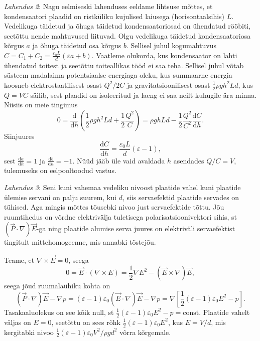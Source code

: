 \textit{Lahendus 2}: Nagu eelmiseski lahenduses eeldame lihtsuse mõttes, et kondensaatori plaadid on ristküliku kujulised laiusega (horisontaalsihis) $L$. Vedelikuga täidetud ja õhuga täidetud kondensaatoriosad on ühendatud rööbiti, seetõttu nende mahtuvused liituvad. Olgu vedelikuga täidetud kondensaatoriosa kõrgus $a$ ja õhuga täidetud osa kõrgus $b$. Sellisel juhul  kogumahtuvus $C=C_1+C_2= \frac{\varepsilon_0 L}{d}(\varepsilon a+b)$. Vaatleme olukorda, kus kondensaator on lahti ühendatud toitest ja seetõttu toiteallikas tööd ei saa teha. Sellisel juhul võtab süsteem madalaima potentsiaalse energiaga oleku, kus summaarne energia koosneb elektrostaatilisest osast $Q^2/2C$ ja gravitatsioonilisest osast $\frac 12\rho g h^2Ld$, kus $Q=VC$ säilib, sest plaadid on isoleeritud ja laeng ei saa neilt kuhugile ära minna. Niisiis on meie tingimus
$$0=\frac {\mathrm d}{\mathrm d h}\left( \frac 12\rho g h^2Ld+\frac 12\frac{Q^2}C\right)= \rho g hLd-\frac 12\frac{Q^2}{C^{2}} \frac{\mathrm dC}{\mathrm dh}.$$
Siinjuures
$$ \frac{\mathrm dC}{\mathrm dh}=\frac{\varepsilon_0 L}{d}(\varepsilon -1),$$
sest $\frac{\mathrm da}{\mathrm dh}=1$ ja $\frac{\mathrm db}{\mathrm dh}=-1$. Nüüd jääb üle vaid avaldada $h$ asendades $Q/C=V$, tulemuseks on eelpooltoodud vastus.

\textit{Lahendus 3}:
Seni kuni vahemaa vedeliku nivoost plaatide vahel kuni plaatide ülemise servani on palju suurem, kui $d$, siis servaefektid plaatide servades on tühised. Aga mingis mõttes tõusebki nivoo just servaefektide tõttu. Jõu ruumtihedus on võrdne elektrivälja tuletisega polarisatsioonivektori sihis, st $(\vec P\cdot\nabla)\vec E$-ga ning plaatide alumise serva juures on elektriväli servaefektist tingitult mittehomogeenne, mis annabki tõstejõu.

Teame, et $\nabla \times\vec E=0$, seega
\[
  0=\vec E\cdot(\nabla \times E)=\frac 12 \nabla E^2-(\vec E\times\nabla)\vec E,
\]
seega jõud ruumalaühiku kohta on
\[(\vec P \cdot \nabla)\vec E-\nabla p=(\varepsilon-1)\varepsilon_0(\vec E \cdot \nabla)\vec E-\nabla p=\nabla \left[\frac 12(\varepsilon-1)\varepsilon_0E^2-p \right].
\] Tasakaaluolekus on see kõik null, st $\frac 12(\varepsilon-1)\varepsilon_0E^2-p=\text{const}$. Plaatide vahelt väljas on $E=0$, seetõttu on sees rõhk  $\frac 12(\varepsilon-1)\varepsilon_0E^2$, kus $E=V/d$, mis kergitabki nivoo  $\frac 12(\varepsilon-1)\varepsilon_0V^2/\rho gd^2$ võrra kõrgemale.
\probend